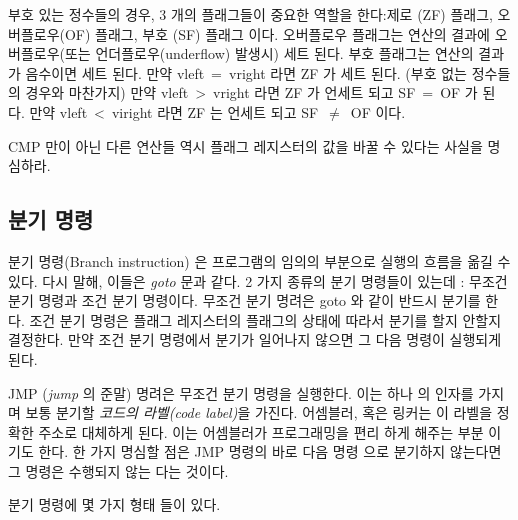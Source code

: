 
부호 있는 정수들의 경우, 3 개의 플래그들이 중요한 역할을 한다:제로
 (ZF) 플래그, 오버플로우(OF)
플래그, 부호 (SF) 플래그 이다.  
오버플로우 플래그는 연산의 결과에 오버플로우(또는 언더플로우(underflow) 발생시)
세트 된다. 부호 플래그는 연산의 결과가 음수이면 세트 된다. 만약 {\code vleft~=~vright}
라면 ZF 가 세트 된다. (부호 없는 정수들의 경우와 마찬가지) 만약 {\code vleft~>~vright} 
라면 ZF 가 언세트 되고 SF~=~OF 가 된다. 만약 {\code vleft~<~viright} 라면 ZF 는 
언세트 되고 SF~$\neq$~OF 이다.

{\code CMP} 만이 아닌 다른 연산들 역시 플래그 레지스터의 값을 바꿀 수 있다는
사실을 명심하라. 


\subsection{분기 명령}

분기 명령(Branch instruction) 은 프로그램의 임의의 부분으로 실행의 흐름을
옮길 수 있다. 다시 말해, 이들은 \emph{goto} 문과 같다. 2 가지 종류의 분기
명령들이 있는데 : 무조건 분기 명령과 조건 분기 명령이다. 무조건 분기 명려은 goto 
와 같이 반드시 분기를 한다. 조건 분기 명령은 플래그 레지스터의 플래그의 상태에 
따라서 분기를 할지 안할지 결정한다. 만약 조건 분기 명령에서 분기가 일어나지 
않으면 그 다음 명령이 실행되게 된다. 

{\code JMP} (\emph{jump} 의 준말) 명려은 무조건 분기 명령을 실행한다. 이는 하나
의 인자를 가지며 보통 분기할 \emph{코드의 라벨(code label)}을 가진다. 어셈블러, 혹은
링커는 이 라벨을 정확한 주소로 대체하게 된다. 이는 어셈블러가 프로그래밍을 편리
하게 해주는 부분 이기도 한다. 한 가지 명심할 점은 {\code JMP} 명령의 바로 다음 명령
으로 분기하지 않는다면 그 명령은 수행되지 않는 다는 것이다. 

분기 명령에 몇 가지 형태 들이 있다. 

